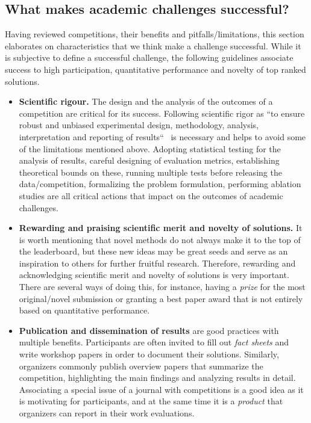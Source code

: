 \documentclass[twoside,11pt]{article}
\begin{document}
\subsection{What makes academic challenges successful?}
\label{sec:successful_challenges}
Having reviewed competitions, their benefits and pitfalls/limitations, this section elaborates on characteristics that we think make a challenge successful. While it is subjective to define a successful challenge, the following guidelines %
associate success to high participation, quantitative performance and novelty of top ranked solutions.
\begin{itemize}
    \item \textbf{Scientific rigour.} The design and the analysis of the outcomes of a competition are critical for its success. Following  scientific rigor as ``to ensure robust and unbiased experimental design, methodology, analysis, interpretation and reporting of results``~\citep{10.1093/carcin/bgx085} is necessary and helps to avoid some of the  limitations mentioned above. Adopting statistical testing for the analysis of results, careful designing of evaluation metrics, establishing theoretical bounds on these,  running multiple tests before releasing the data/competition,  formalizing the problem formulation, performing ablation studies are all critical actions that impact on the outcomes of academic challenges. 
    
    \item \textbf{Rewarding and praising scientific merit and novelty of solutions.} It is worth mentioning that novel methods do not always make it to the top of the leaderboard, but these new ideas may be great seeds and serve as an inspiration to others for further fruitful research. Therefore, rewarding and acknowledging scientific merit and novelty of solutions is very important. There are several ways of doing this, for instance, having a \emph{prize} for the most original/novel submission or granting a best paper award that is not entirely based on quantitative performance.


    \item \textbf{Publication and dissemination of results} are  good practices with multiple benefits. Participants are often invited to fill out  \emph{fact sheets} and write workshop papers in order to document their solutions. Similarly, organizers  commonly publish overview papers that summarize the competition, highlighting the main findings and analyzing results in detail.  Associating a special issue of a journal %
    with competitions is a good idea as it is motivating for participants, and at the same time it is a \emph{product} that organizers can report in their work evaluations. 
    

\end{itemize}
\end{document}
